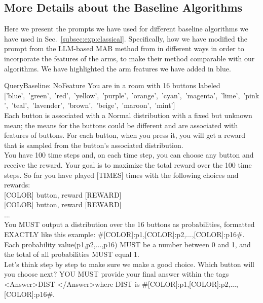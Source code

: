 \subsection{More Details about the Baseline Algorithms}
Here we present the prompts we have used for different baseline algorithms we have used in Sec.~\ref{subsec:exp:classical}.
Specifically, how we have modified the prompt from the LLM-based MAB method from \cite{krishnamurthy2024can} in different ways in order to incorporate the features of the arms, to make their method comparable with our algorithms.
We have highlighted the arm features we have added in {\color{blue}blue}.


\begin{mycolorbox}{Query}{Baseline: NoFeature}
\scriptsize
You are in a room with 16 buttons labeled\\
\mbox{['blue', 'green', 'red', 'yellow', 'purple', 'orange', 'cyan', 'magenta', 'lime', 'pink', 'teal', 'lavender', 'brown', 'beige', 'maroon', 'mint']}\\
Each button is associated with a Normal distribution with a fixed but unknown mean; the means for the buttons could be different and are associated with features of buttons. For each button, when you press it, you will get a reward that is sampled from the button's associated distribution.\\
You have 100 time steps and, on each time step, you can choose any button and receive the reward. Your goal is to maximize the total reward over the 100 time steps. So far you have played [TIMES] times with the following choices and rewards:\\
\mbox{[COLOR]} button, reward \mbox{[REWARD]}\\
\mbox{[COLOR]} button, reward \mbox{[REWARD]}\\
...\\
You MUST output a distribution over the 16 buttons as probabilities, formatted EXACTLY like this example: \#[COLOR]:p1,[COLOR]:p2,...,[COLOR]:p16\#. Each probability value(p1,p2,...,p16) MUST be a number between 0 and 1, and the total of all probabilities MUST equal 1.\\
Let's think step by step to make sure we make a good choice. Which button will you choose next? YOU MUST provide your final answer within the tags \textless Answer\textgreater DIST \textless /Answer\textgreater where DIST is \#[COLOR]:p1,[COLOR]:p2,...,[COLOR]:p16\#.\\
\end{mycolorbox}



